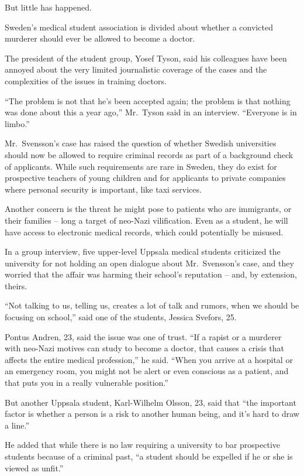 \documentclass[12pt,a4paper,onecolumn]{article}
\begin{document}
\begin{CJK*}{GBK}{song}
But little has happened.

Sweden's medical student association is divided about whether a convicted murderer should ever be
allowed to become a doctor.

The president of the student group, Yosef Tyson, said his colleagues have been annoyed about the
very limited journalistic coverage of the cases and the complexities of the issues in training
doctors.

``The problem is not that he's been accepted again; the problem is that nothing was done about this
a year ago,'' Mr.~Tyson said in an interview. ``Everyone is in limbo.''

Mr.~Svensson's case has raised the question of whether Swedish universities should now be allowed to
require criminal records as part of a background check of applicants. While such requirements are
rare in Sweden, they do exist for prospective teachers of young children and for applicants to
private companies where personal security is important, like taxi services.

Another concern is the threat he might pose to patients who are immigrants, or their families --
long a target of neo-Nazi vilification. Even as a student, he will have access to electronic medical
records, which could potentially be misused.

In a group interview, five upper-level Uppsala medical students criticized the university for not
holding an open dialogue about Mr.~Svensson's case, and they worried that the affair was harming
their school's reputation -- and, by extension, theirs.

``Not talking to us, telling us, creates a lot of talk and rumors, when we should be focusing on
school,'' said one of the students, Jessica Svefors, 25.

Pontus Andren, 23, said the issue was one of trust. ``If a rapist or a murderer with neo-Nazi
motives can study to become a doctor, that causes a crisis that affects the entire medical
profession,'' he said. ``When you arrive at a hospital or an emergency room, you might not be alert
or even conscious as a patient, and that puts you in a really vulnerable position.''

But another Uppsala student, Karl-Wilhelm Olsson, 23, said that ``the important factor is whether a
person is a risk to another human being, and it's hard to draw a line.''

He added that while there is no law requiring a university to bar prospective students because of a
criminal past, ``a student should be expelled if he or she is viewed as unfit.''


\end{CJK*}
\end{document}
